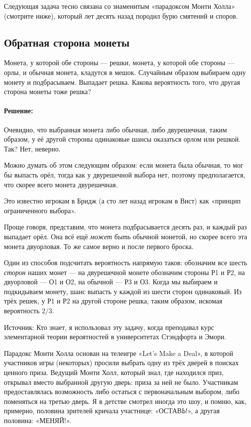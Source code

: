 \medskip

Следующая задача тесно связана со знаменитым «парадоксом Монти Холла» (смотрите ниже), который лет десять назад породил бурю смятений и споров.

\subsection*{Обратная сторона монеты}%

Монета, у которой обе стороны --- решки, монета, у которой обе стороны --- орлы, и обычная монета, кладутся в мешок.
Случайным образом выбираем одну монету и подбрасываем.
Выпадает решка.
Какова вероятность того, что другая сторона монеты тоже решка?

\paragraph{Решение:}
Очевидно, что выбранная монета либо обычная, либо двурешечная, таким образом, у её другой стороны одинаковые шансы оказаться орлом или решкой.
Так?
Нет, неверно.

Можно думать об этом следующим образом: если монета была обычная, то мог бы выпасть орёл, тогда как у двурешечной выбора нет, поэтому предполагается, что скорее всего монета двурешечная.

Это известно игрокам в Бридж (а сто лет назад игрокам в Вист) как «принцип ограниченного выбора».

Проще говоря, представим, что монета подбрасывается десять раз, и каждый раз выпадает орёл.
Она всё ещё \emph{может быть} обычной монетой, но скорее всего эта монета двуорловая.
То же самое верно и после первого броска.

Один из способов подсчитать вероятность напрямую таков:
обозначим все шесть \emph{сторон} наших монет ---
на двурешечной монете обозначим стороны Р1 и Р2, на двуорловой --- О1 и О2, на обычной --- Р3 и О3.
Когда мы выбираем и подкидываем монету, шанс выпасть у каждой из шести сторон одинаковый.
Из трёх решек, у Р1 и Р2 на другой стороне решка, таким образом, искомая вероятность $2/3$.\heart

Источник: Кто знает, я использовал эту задачу, когда преподавал курс элементарной теории вероятностей в университетах Стэндфорта и Эмори.

\medskip

Парадокс Монти Холла основан на телеигре «Let’s Make a Deal», в которой участников игры (некоторых) просили выбрать одну из трёх дверей в поисках ценного приза.
Ведущий Монти Холл, который знал, где находился приз, открывал вместо выбранной другую дверь: приза за ней не было.
Участникам предоставлялась возможность либо остаться с первоначальным выбором, либо поменяться на третью дверь.
Я в детстве смотрел иногда это шоу, и помню, как, примерно, половина зрителей кричала участнице: «ОСТАВЬ!», а другая половина: «МЕНЯЙ!».

